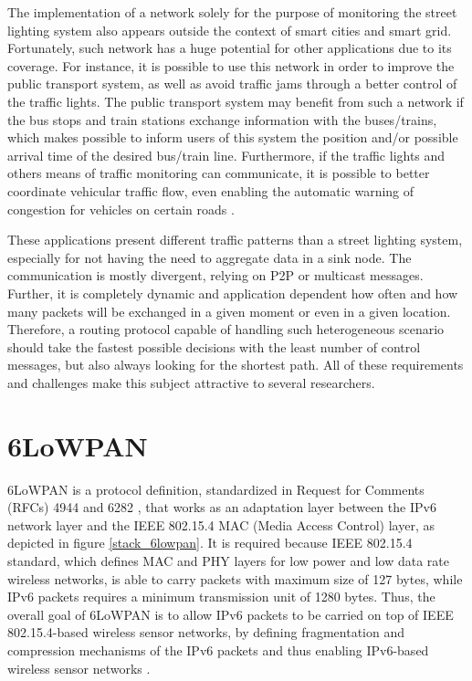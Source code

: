 \documentclass[final,authoryear,3p,twocolumn]{elsarticle}
\begin{document}
The implementation of a network solely for the purpose of monitoring the street lighting system also appears outside the context of smart cities and smart grid. Fortunately, such network has a huge potential for other applications due to its coverage. For instance, it is possible to use this network in order to improve the public transport system, as well as avoid traffic jams through a better control of the traffic lights. The public transport system may benefit from such a network if the bus stops and train stations exchange information with the buses/trains, which makes possible to inform users of this system the position and/or possible arrival time of the desired bus/train line. Furthermore, if the traffic lights and others means of traffic monitoring can communicate, it is possible to better coordinate vehicular traffic flow, even enabling the automatic warning of congestion for vehicles on certain roads \citep{SmartCity_ITS_2013}.

These applications present different traffic patterns than a street lighting system, especially for not having the need to aggregate data in a sink node. The communication is mostly divergent, relying on P2P or multicast messages. Further, it is completely dynamic and application dependent how often and how many packets will be exchanged in a given moment or even in a given location. Therefore, a routing protocol capable of handling such heterogeneous scenario should take the fastest possible decisions with the least number of control messages, but also always looking for the shortest path. All of these requirements and challenges make this subject attractive to several researchers.

\section{6LoWPAN}
\label{sec6LoWPAN}

6LoWPAN is a protocol definition, standardized in Request for Comments (RFCs) 4944 and 6282 \citep{RFC4944,RFC6282}, that works as an adaptation layer between the IPv6 network layer and the IEEE 802.15.4 MAC (Media Access Control) layer, as depicted in figure \ref{stack_6lowpan}. It is required because IEEE 802.15.4 standard, which defines MAC and PHY layers for low power and low data rate wireless networks, is able to carry packets with maximum size of 127 bytes, while IPv6 packets requires a minimum transmission unit of 1280 bytes. Thus, the overall goal of 6LoWPAN is to allow IPv6 packets to be carried on top of IEEE 802.15.4-based wireless sensor networks, by defining fragmentation and compression mechanisms of the IPv6 packets and thus enabling IPv6-based wireless sensor networks \citep{Mulligan_6LoWPAN_2007}.
\end{document}
